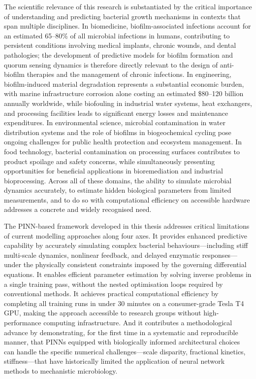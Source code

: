 \documentclass[14pt,a4paper,openany]{extbook}
\begin{document}
The scientific relevance of this research is substantiated by the critical importance of understanding and predicting bacterial growth mechanisms in contexts that span multiple disciplines. In biomedicine, biofilm-associated infections account for an estimated 65--80\% of all microbial infections in humans, contributing to persistent conditions involving medical implants, chronic wounds, and dental pathologies; the development of predictive models for biofilm formation and quorum sensing dynamics is therefore directly relevant to the design of anti-biofilm therapies and the management of chronic infections. In engineering, biofilm-induced material degradation represents a substantial economic burden, with marine infrastructure corrosion alone costing an estimated \$80--120 billion annually worldwide, while biofouling in industrial water systems, heat exchangers, and processing facilities leads to significant energy losses and maintenance expenditures. In environmental science, microbial contamination in water distribution systems and the role of biofilms in biogeochemical cycling pose ongoing challenges for public health protection and ecosystem management. In food technology, bacterial contamination on processing surfaces contributes to product spoilage and safety concerns, while simultaneously presenting opportunities for beneficial applications in bioremediation and industrial bioprocessing. Across all of these domains, the ability to simulate microbial dynamics accurately, to estimate hidden biological parameters from limited measurements, and to do so with computational efficiency on accessible hardware addresses a concrete and widely recognised need.

The PINN-based framework developed in this thesis addresses critical limitations of current modelling approaches along four axes. It provides enhanced predictive capability by accurately simulating complex bacterial behaviours---including stiff multi-scale dynamics, nonlinear feedback, and delayed enzymatic responses---under the physically consistent constraints imposed by the governing differential equations. It enables efficient parameter estimation by solving inverse problems in a single training pass, without the nested optimisation loops required by conventional methods. It achieves practical computational efficiency by completing all training runs in under 30 minutes on a consumer-grade Tesla T4 GPU, making the approach accessible to research groups without high-performance computing infrastructure. And it contributes a methodological advance by demonstrating, for the first time in a systematic and reproducible manner, that PINNs equipped with biologically informed architectural choices can handle the specific numerical challenges---scale disparity, fractional kinetics, stiffness---that have historically limited the application of neural network methods to mechanistic microbiology.
\end{document}
